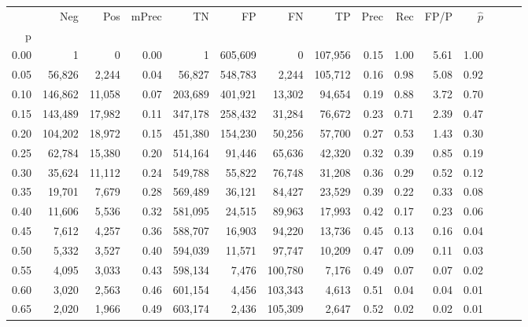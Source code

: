 \begin{tabular}{rrrrrrrrrrrrrrr}
\toprule
{} &      Neg &     Pos & mPrec &       TN &       FP &       FN &       TP &  Prec &   Rec &  FP/P & $\hat{p}$ \\
p    &          &         &       &          &          &          &          &       &       &       &           \\
\midrule
0.00 &        1 &       0 &  0.00 &        1 &  605,609 &        0 &  107,956 &  0.15 &  1.00 &  5.61 &      1.00 \\
0.05 &   56,826 &   2,244 &  0.04 &   56,827 &  548,783 &    2,244 &  105,712 &  0.16 &  0.98 &  5.08 &      0.92 \\
0.10 &  146,862 &  11,058 &  0.07 &  203,689 &  401,921 &   13,302 &   94,654 &  0.19 &  0.88 &  3.72 &      0.70 \\
0.15 &  143,489 &  17,982 &  0.11 &  347,178 &  258,432 &   31,284 &   76,672 &  0.23 &  0.71 &  2.39 &      0.47 \\
0.20 &  104,202 &  18,972 &  0.15 &  451,380 &  154,230 &   50,256 &   57,700 &  0.27 &  0.53 &  1.43 &      0.30 \\
0.25 &   62,784 &  15,380 &  0.20 &  514,164 &   91,446 &   65,636 &   42,320 &  0.32 &  0.39 &  0.85 &      0.19 \\
0.30 &   35,624 &  11,112 &  0.24 &  549,788 &   55,822 &   76,748 &   31,208 &  0.36 &  0.29 &  0.52 &      0.12 \\
0.35 &   19,701 &   7,679 &  0.28 &  569,489 &   36,121 &   84,427 &   23,529 &  0.39 &  0.22 &  0.33 &      0.08 \\
0.40 &   11,606 &   5,536 &  0.32 &  581,095 &   24,515 &   89,963 &   17,993 &  0.42 &  0.17 &  0.23 &      0.06 \\
0.45 &    7,612 &   4,257 &  0.36 &  588,707 &   16,903 &   94,220 &   13,736 &  0.45 &  0.13 &  0.16 &      0.04 \\
0.50 &    5,332 &   3,527 &  0.40 &  594,039 &   11,571 &   97,747 &   10,209 &  0.47 &  0.09 &  0.11 &      0.03 \\
0.55 &    4,095 &   3,033 &  0.43 &  598,134 &    7,476 &  100,780 &    7,176 &  0.49 &  0.07 &  0.07 &      0.02 \\
0.60 &    3,020 &   2,563 &  0.46 &  601,154 &    4,456 &  103,343 &    4,613 &  0.51 &  0.04 &  0.04 &      0.01 \\
0.65 &    2,020 &   1,966 &  0.49 &  603,174 &    2,436 &  105,309 &    2,647 &  0.52 &  0.02 &  0.02 &      0.01 \\

\end{tabular}
